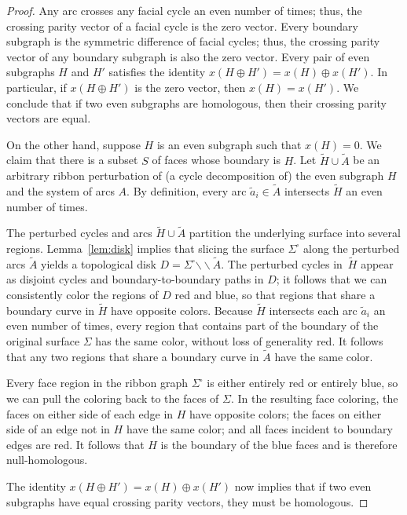 \documentclass[letterpaper,review]{siamart190516}
\def\snip{\mathbin{\raisebox{0.15ex}{\rotatebox[origin=c]{60}{\Rightscissors}\!}}}
\def\snip{\mathbin{\backslash\!\!\backslash}}
\def\anote#1{\color{purple}Amir: #1 \color{black}}
\begin{document}
\begin{proof}
Any arc crosses any facial cycle an even number of times; thus, the crossing parity vector of a facial cycle is the zero vector.  Every boundary subgraph is the symmetric difference of facial cycles; thus, the crossing parity vector of any boundary subgraph is also the zero vector.  Every pair of even subgraphs $H$ and $H'$ satisfies the identity $x(H\oplus H') = x(H) \oplus x(H')$.  In particular, if $x(H\oplus H')$ is the zero vector, then $x(H) = x(H')$.  We conclude that if two even subgraphs are homologous, then their crossing parity vectors are equal.

On the other hand, suppose $H$ is an even subgraph such that $x(H) = 0$.  We claim that there is a subset $S$ of faces whose boundary is $H$.  Let $\tilde{H} \cup \tilde{A}$ be an arbitrary ribbon perturbation of (a cycle decomposition of) the even subgraph $H$ and the system of arcs $A$.  By definition, every arc $\tilde{a}_i\in \tilde{A}$ intersects $\tilde{H}$ an even number of times.

The perturbed cycles and arcs $\tilde{H} \cup \tilde{A}$ partition the underlying surface into several regions.  Lemma~\ref{lem:disk} implies that slicing the surface $\Sigma^\square$ along the perturbed arcs $\tilde{A}$ yields a topological disk $D = \Sigma^\square\snip\tilde{A}$.  The perturbed cycles in~$\tilde{H}$ appear as disjoint cycles and boundary-to-boundary paths in $D$; it follows that we can consistently color the regions of $D$ red and blue, so that regions that share a boundary curve in $\tilde{H}$ have opposite colors.  Because $\tilde{H}$ intersects each arc $\tilde{a}_i$ an even number of times, every region that contains part of the boundary of the original surface $\Sigma$ has the same color, without loss of generality red.  It follows that any two regions that share a boundary curve in $\tilde{A}$ have the same color.

Every face region in the ribbon graph $\Sigma^\square$ is either entirely red or entirely blue, so we can pull the coloring back to the faces of $\Sigma$.  In the resulting face coloring, the faces on either side of each edge in $H$ have opposite colors; the faces on either side of an edge not in $H$ have the same color; and all faces incident to boundary edges are red.  It follows that $H$ is the boundary of the blue faces and is therefore null-homologous.

The identity $x(H\oplus H') = x(H) \oplus x(H')$ now implies that if two even subgraphs have equal crossing parity vectors, they must be homologous.
\end{proof}
\end{document}
